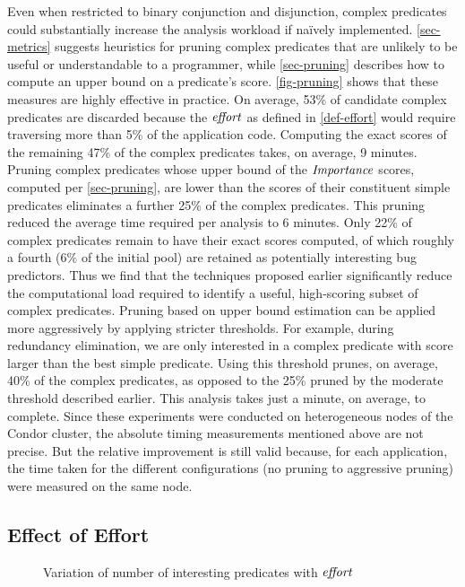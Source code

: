 Even when restricted to binary conjunction and disjunction, complex predicates could substantially increase the analysis workload if na\"ively implemented.  \autoref{sec-metrics} suggests heuristics for pruning complex predicates that are unlikely to be useful or understandable to a programmer, while \autoref{sec-pruning} describes how to compute an upper bound on a predicate's score.  \autoref{fig-pruning} shows that these measures are highly effective in practice.  On average, 53\% of candidate complex predicates are discarded because the $\mathit{effort}$ as defined in \autoref{def-effort} would require traversing more than 5\% of the application code. Computing the exact scores of the remaining 47\% of the complex predicates takes, on average, 9 minutes.  Pruning complex predicates whose upper bound of the $\mathit{Importance}$ scores, computed per \autoref{sec-pruning}, are lower than the scores of their constituent simple predicates eliminates a further 25\% of the complex predicates.  This pruning reduced the average time required per analysis to 6 minutes.  Only 22\% of complex predicates remain to have their exact scores computed, of which roughly a fourth (6\% of the initial pool) are retained as potentially interesting bug predictors.  Thus we find that the techniques proposed earlier significantly reduce the computational load required to identify a useful, high-scoring subset of complex predicates.  Pruning based on upper bound estimation can be applied more aggressively by applying stricter thresholds.  For example, during redundancy elimination, we are only interested in a complex predicate with score larger than the best simple predicate.  Using this threshold prunes, on average, 40\% of the complex predicates, as opposed to the 25\% pruned by the moderate threshold described earlier.  This analysis takes just a minute, on average, to complete.  Since these experiments were conducted on heterogeneous nodes of the Condor \cite{condor-hunter} cluster, the absolute timing measurements mentioned above are not precise.  But the relative improvement is still valid because, for each application, the time taken for the different configurations (no pruning to aggressive pruning) were measured on the same node.



\subsection{Effect of Effort}

\begin{figure*}[tb]
  \centering
  \hfill
  \caption{Variation of number of interesting predicates with $\mathit{effort}$}
  \label{fig-effort}
\end{figure*}

